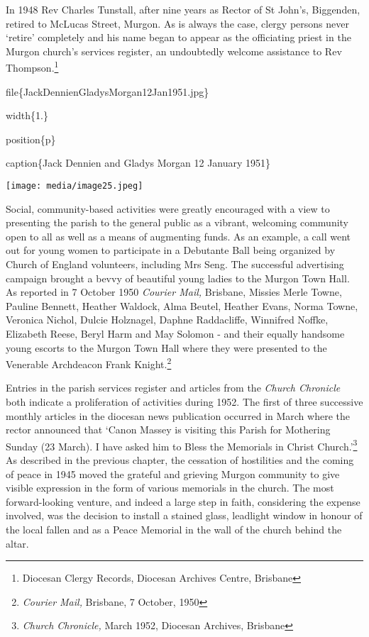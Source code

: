 In 1948 Rev Charles Tunstall, after nine years as Rector of St John's, Biggenden, retired to McLucas Street, Murgon. As is always the case, clergy persons never `retire' completely and his name began to appear as the officiating priest in the Murgon church's services register, an undoubtedly welcome assistance to Rev Thompson.\footnote{Diocesan Clergy Records, Diocesan Archives Centre, Brisbane}

file\{JackDennienGladysMorgan12Jan1951.jpg\}

width\{1.\}

position\{p\}

caption\{Jack Dennien and Gladys Morgan 12 January 1951\}

\texttt{[image: media/image25.jpeg]}

Social, community-based activities were greatly encouraged with a view to presenting the parish to the general public as a vibrant, welcoming community open to all as well as a means of augmenting funds. As an example, a call went out for young women to participate in a Debutante Ball being organized by Church of England volunteers, including Mrs Seng. The successful advertising campaign brought a bevvy of beautiful young ladies to the Murgon Town Hall. As reported in 7 October 1950 \emph{Courier Mail,} Brisbane, Missies Merle Towne, Pauline Bennett, Heather Waldock, Alma Beutel, Heather Evans, Norma Towne, Veronica Nichol, Dulcie Holznagel, Daphne Raddacliffe, Winnifred Noffke, Elizabeth Reese, Beryl Harm and May Solomon - and their equally handsome young escorts to the Murgon Town Hall where they were presented to the Venerable Archdeacon Frank Knight.\footnote{\emph{Courier Mail,} Brisbane, 7 October, 1950}

Entries in the parish services register and articles from the \emph{Church Chronicle} both indicate a proliferation of activities during 1952. The first of three successive monthly articles in the diocesan news publication occurred in March where the rector announced that `Canon Massey is visiting this Parish for Mothering Sunday (23 March). I have asked him to Bless the Memorials in Christ Church.'\footnote{\emph{Church Chronicle,} March 1952, Diocesan Archives, Brisbane} As described in the previous chapter, the cessation of hostilities and the coming of peace in 1945 moved the grateful and grieving Murgon community to give visible expression in the form of various memorials in the church. The most forward-looking venture, and indeed a large step in faith, considering the expense involved, was the decision to install a stained glass, leadlight window in honour of the local fallen and as a Peace Memorial in the wall of the church behind the altar.

